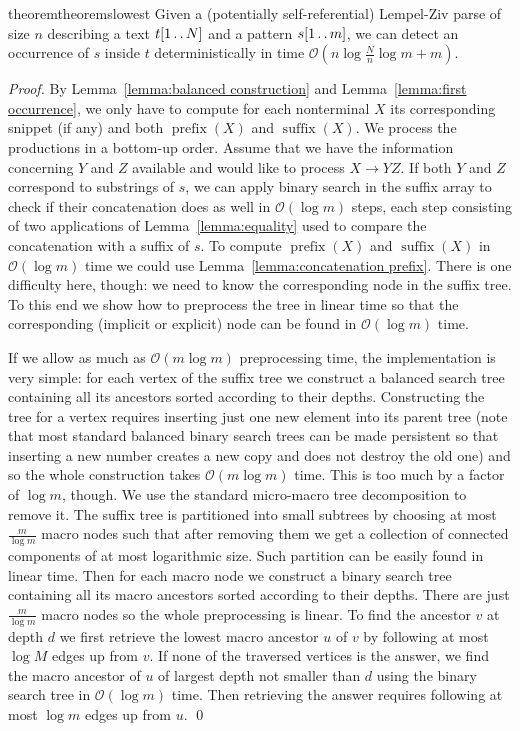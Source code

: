 \documentclass[runningheads]{llncs}
\DeclareMathOperator{\prefix}{prefix}
\DeclareMathOperator{\suffix}{suffix}
\newcommand{\twodots}{\mathinner{\ldotp\ldotp}}
\begin{document}
\begin{restatable}{theorem}{theoremslowest}
\label{theorem:slowest}
Given a (potentially self-referential) Lempel-Ziv parse of size $n$ describing a text $t[1\twodots N]$ and a pattern $s[1\twodots m]$, we can detect an occurrence of $s$ inside $t$ deterministically in time $\mathcal{O}(n\log\frac{N}{n}\log m+m)$.
\end{restatable}

\begin{proof}
By Lemma~\ref{lemma:balanced construction} and Lemma~\ref{lemma:first occurrence}, we only have to compute for each nonterminal $X$ its corresponding snippet (if any) and both $\prefix(X)$ and $\suffix(X)$. We process the productions in a bottom-up order. Assume that we have the information concerning $Y$ and $Z$ available and would like to process $X\rightarrow YZ$. If both $Y$ and $Z$ correspond to substrings of $s$, we can apply binary search in the suffix array to check if their concatenation does as well in $\mathcal{O}(\log m)$ steps, each step consisting of two applications of Lemma~\ref{lemma:equality} used to compare the concatenation with a suffix of $s$. To compute $\prefix(X)$ and $\suffix(X)$ in $\mathcal{O}(\log m)$ time we could use Lemma~\ref{lemma:concatenation prefix}. There is one difficulty here, though: we need to know the corresponding node in the suffix tree. To this end we show how to preprocess the tree in linear time so that the corresponding (implicit or explicit) node can be found in $\mathcal{O}(\log m)$ time.

If we allow as much as $\mathcal{O}(m\log m)$ preprocessing time, the implementation is very simple: for each vertex of the suffix tree we construct
a balanced search tree containing all its ancestors sorted according to their depths. Constructing the tree for a vertex requires inserting just
one new element into its parent tree (note that most standard balanced binary search trees can be made persistent so that inserting a new number creates a new copy and does not destroy the old one) and so the whole construction takes $\mathcal{O}(m\log m)$ time. This is too much by a factor
of $\log m$, though. We use the standard micro-macro tree decomposition to remove it. The suffix tree is partitioned into small subtrees by
choosing at most $\frac{m}{\log m}$ macro nodes such that after removing them we get a collection of connected components of at most
logarithmic size. Such partition can be easily found in linear time. Then for each macro node we construct a binary search tree containing
all its macro ancestors sorted according to their depths. There are just $\frac{m}{\log m}$ macro nodes so the whole preprocessing is linear.
To find the ancestor $v$ at depth $d$ we first retrieve the lowest macro ancestor $u$ of $v$ by following at most $\log M$ edges up from $v$. 
If none of the traversed vertices is the answer, we find the macro ancestor of $u$ of largest depth not smaller than $d$ using the binary search tree in
$\mathcal{O}(\log m)$ time. Then retrieving the answer requires following at most $\log m$ edges up from $u$.
\qed
\end{proof}
\end{document}
